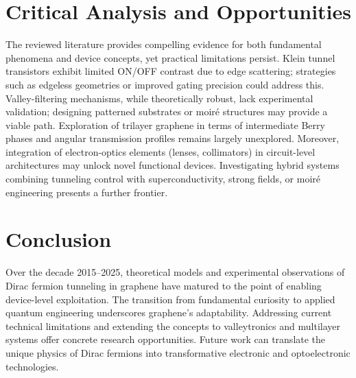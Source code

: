 \documentclass[12pt]{article}
\begin{document}
\section{Critical Analysis and Opportunities}
The reviewed literature provides compelling evidence for both fundamental phenomena and device concepts, yet practical limitations persist. Klein tunnel transistors exhibit limited ON/OFF contrast due to edge scattering; strategies such as edgeless geometries or improved gating precision could address this. Valley-filtering mechanisms, while theoretically robust, lack experimental validation; designing patterned substrates or moiré structures may provide a viable path. Exploration of trilayer graphene in terms of intermediate Berry phases and angular transmission profiles remains largely unexplored. Moreover, integration of electron-optics elements (lenses, collimators) in circuit-level architectures may unlock novel functional devices. Investigating hybrid systems combining tunneling control with superconductivity, strong fields, or moiré engineering presents a further frontier.

\section{Conclusion}
Over the decade 2015–2025, theoretical models and experimental observations of Dirac fermion tunneling in graphene have matured to the point of enabling device-level exploitation. The transition from fundamental curiosity to applied quantum engineering underscores graphene’s adaptability. Addressing current technical limitations and extending the concepts to valleytronics and multilayer systems offer concrete research opportunities. Future work can translate the unique physics of Dirac fermions into transformative electronic and optoelectronic technologies.



\end{document}
